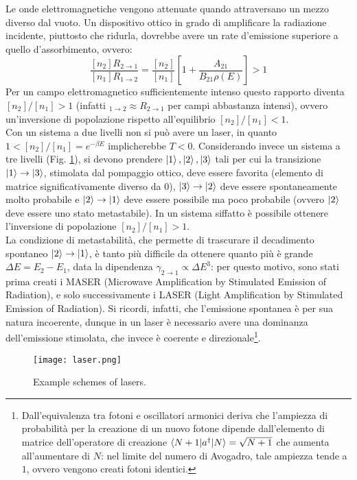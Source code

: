 Le onde elettromagnetiche vengono attenuate quando attraversano un mezzo diverso dal vuoto. Un dispositivo ottico in grado di amplificare la radiazione incidente, piuttosto che ridurla, dovrebbe avere un rate d'emissione superiore a quello d'assorbimento, ovvero:
\begin{equation*}
	\frac{[n_2] R_{2 \rightarrow 1}}{[n_1] R_{1 \rightarrow 2}} = \frac{[n_2]}{[n_1]} \left[ 1 + \frac{A_{21}}{B_{21} \rho(E)} \right] > 1
\end{equation*}
Per un campo elettromagnetico sufficientemente intenso questo rapporto diventa $ [n_2] / [n_1] > 1 $ (infatti $ _{1 \rightarrow 2} \approx R_{2 \rightarrow 1} $ per campi abbastanza intensi), ovvero un'inversione di popolazione rispetto all'equilibrio $ [n_2] / [n_1] < 1 $. \\
Con un sistema a due livelli non si può avere un laser, in quanto $ 1 < [n_2] / [n_1] = e^{-\beta E} $ implicherebbe $ T < 0 $. Considerando invece un sistema a tre livelli (Fig. \ref{laser}), si devono prendere $ \ket{1},\ket{2},\ket{3} $ tali per cui la transizione $ \ket{1} \rightarrow \ket{3} $, stimolata dal pompaggio ottico, deve essere favorita (elemento di matrice significativamente diverso da 0), $ \ket{3} \rightarrow \ket{2} $ deve essere spontaneamente molto probabile e $ \ket{2} \rightarrow \ket{1} $ deve essere possibile ma poco probabile (ovvero $ \ket{2} $ deve essere uno stato metastabile). In un sistema siffatto è possibile ottenere l'inversione di popolazione $ [n_2] / [n_1] > 1 $. \\
La condizione di metastabilità, che permette di trascurare il decadimento spontaneo $ \ket{2} \rightarrow \ket{1} $, è tanto più difficile da ottenere quanto più è grande $ \Delta E = E_2 - E_1 $, data la dipendenza $ \gamma_{2 \rightarrow 1} \propto \Delta E^3 $: per questo motivo, sono stati prima creati i MASER (Microwave Amplification by Stimulated Emission of Radiation), e solo successivamente i LASER (Light Amplification by Stimulated Emission of Radiation). Si ricordi, infatti, che l'emissione spontanea è per sua natura incoerente, dunque in un laser è necessario avere una dominanza dell'emissione stimolata, che invece è coerente e direzionale\footnote{Dall'equivalenza tra fotoni e oscillatori armonici deriva che l'ampiezza di probabilità per la creazione di un nuovo fotone dipende dall'elemento di matrice dell'operatore di creazione $ \braket{N + 1 | a^\dagger | N} = \sqrt{N + 1} $ che aumenta all'aumentare di $ N $: nel limite del numero di Avogadro, tale ampiezza tende a $ 1 $, ovvero vengono creati fotoni identici.}.

\begin{figure}
	\centering
	\texttt{[image: laser.png]}
	\caption{Example schemes of lasers.}
	\label{laser}
\end{figure}











